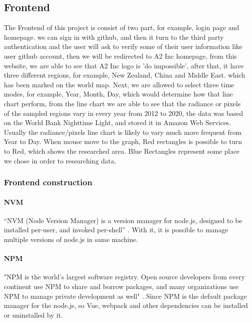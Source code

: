 \documentclass[conference]{IEEEtran}
\begin{document}
\subsection{Frontend}
The Frontend of this project is consist of two part, for example, login page and homepage.
we can sign in with github, and then it turn to the third party authentication and the user
will ask to verify some of their user information like user github account, then we will
be redirected to A2 Inc homepage, from this website, we are able to see that A2 Inc logo
is 'do impossible', after that, it have three different regions, for example, New Zealand,
China and Middle East. which has been marked on the world map. Next, we are allowed to select
three time modes, for example, Year, Month, Day, which would determine how that line chart
perform, from the line chart we are able to see that the radiance or pixels of the sampled
regions vary in every year from 2012 to 2020, the data was based on the World Bank Nighttime
Light, and stored it in Amazon Web Services. Usually the radiance/pixels line chart is likely
to vary much more frequent from Year to Day. When mouse move to the graph, Red rectangles
is possible to turn to Red, which shows the researched area. Blue Rectangles represent some
place we chose in order to researching data.

\subsubsection{Frontend construction}
 
\paragraph{NVM}
    
“NVM (Node Version Manager) is a version manager for node.js, designed to be installed per-user, and invoked per-shell” 
\cite{nvmshnvm87:online}. With it, it is possible to manage multiple versions of node.js in same machine.

\paragraph{NPM}

"NPM is the world's largest software registry. Open source developers from every continent use NPM to share and borrow packages, 
and many organizations use NPM to manage private development as well" \cite{Aboutnpm31:online}. Since NPM is the default package manager for the 
node.js, so Vue, webpack and other dependencies can be installed or uninstalled by it.
\end{document}
